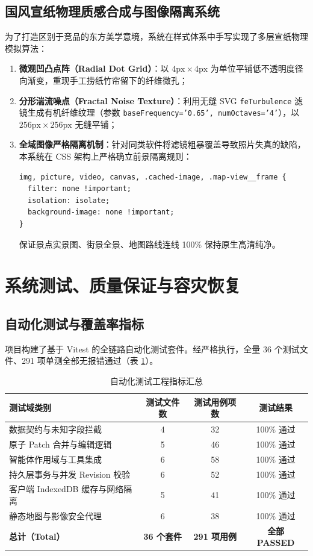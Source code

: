 \documentclass[11pt,a4paper,UTF8]{ctexart}
\begin{document}
\subsection{国风宣纸物理质感合成与图像隔离系统}
为了打造区别于竞品的东方美学意境，系统在样式体系中手写实现了多层宣纸物理模拟算法：
\begin{enumerate}
    \item \textbf{微观凹凸点阵（Radial Dot Grid）}：以 $4\text{px}\times 4\text{px}$ 为单位平铺低不透明度径向渐变，重现手工捞纸竹帘留下的纤维微孔；
    \item \textbf{分形湍流噪点（Fractal Noise Texture）}：利用无缝 SVG \texttt{feTurbulence} 滤镜生成有机纤维纹理（参数 \texttt{baseFrequency='0.65', numOctaves='4'}），以 $256\text{px}\times 256\text{px}$ 无缝平铺；
    \item \textbf{全域图像严格隔离机制}：针对同类软件将滤镜粗暴覆盖导致照片失真的缺陷，本系统在 CSS 架构上严格确立前景隔离规则：
    \begin{lstlisting}[language=html,caption=媒体图层隔离规则]
img, picture, video, canvas, .cached-image, .map-view__frame {
  filter: none !important;
  isolation: isolate;
  background-image: none !important;
}
    \end{lstlisting}
    保证景点实景图、街景全景、地图路线连线 100\% 保持原生高清纯净。
\end{enumerate}

\section{系统测试、质量保证与容灾恢复}

\subsection{自动化测试与覆盖率指标}
项目构建了基于 Vitest 的全链路自动化测试套件。经严格执行，全量 36 个测试文件、291 项单测全部无报错通过（表 \ref{tab:test_metrics}）。

\begin{table}[htbp]
\centering
\small
\caption{自动化测试工程指标汇总}
\label{tab:test_metrics}
\begin{tabular}{lccc}
\toprule
\textbf{测试域类别} & \textbf{测试文件数} & \textbf{测试用例项数} & \textbf{测试结果} \\
\midrule
数据契约与未知字段拦截 & 4 & 32 & 100\% 通过 \\
原子 Patch 合并与编辑逻辑 & 5 & 46 & 100\% 通过 \\
智能体作用域与工具集成 & 6 & 58 & 100\% 通过 \\
持久层事务与并发 Revision 校验 & 6 & 52 & 100\% 通过 \\
客户端 IndexedDB 缓存与网络隔离 & 5 & 41 & 100\% 通过 \\
静态地图与影像安全代理 & 6 & 38 & 100\% 通过 \\
\midrule
\textbf{总计（Total）} & \textbf{36 个套件} & \textbf{291 项用例} & \textbf{全部 PASSED} \\
\bottomrule
\end{tabular}
\end{table}
\end{document}

